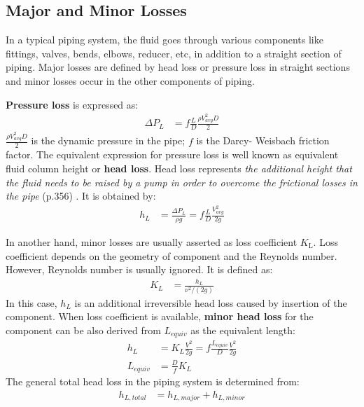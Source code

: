 \subsection{Major and Minor Losses}
In a typical piping system, the fluid goes through various components like fittings, valves, bends, elbows, reducer, etc, in addition to a straight section of piping. Major losses are defined by head loss or pressure loss in straight sections and minor losses occur in the other components of piping. 

\textbf{Pressure loss} is expressed as:
\begin{align}
\Delta P_L & = f \frac{L}{D} \frac{\rho V_{avg}^2 D }{2} 
\end{align}
$\frac{\rho V_{avg}^2 D }{2}$ is the dynamic pressure in the pipe; $f$ is the Darcy- Weisbach friction factor.  
The equivalent expression for pressure loss is well known as equivalent fluid column height or \textbf{head loss}. Head loss represents \textit{the additional height that the fluid needs to be raised by a pump in order to overcome the frictional losses in the pipe} (p.356) \cite{cengel:book}. It is obtained by:
\begin{align}
 h_L & =  \frac{\Delta P_L}{\rho g} = f \frac{L}{D} \frac{V_{avg}^2 }{2g}
\end{align}

In another hand, minor losses are usually asserted as loss coefficient $K_{\text{L}}$.  Loss coefficient depends on the geometry of component and the Reynolds number. However, Reynolds number is usually ignored. It is defined as:
\begin{align}
K_L & =  \frac{h_L}{\nu^2 / (2g)} 
\end{align}
In this case, $h_L$ is an additional irreversible head loss caused by insertion of the component.
When loss coefficient is available, \textbf{minor head loss} for the component can be also derived from $L_{equiv}$ as the equivalent length:
\begin{align}
 h_L & =  K_L \frac{V^2}{2g} = f \frac{L_{equiv}}{D} \frac{V^2 }{2g} \\
 L_{equiv} &= \frac{D}{f} K_L
\end{align}
The general total head loss in the piping system is determined from:
\begin{align}
 h_{L, total} & = h_{L, major} + h_{L, minor}
\end{align}

